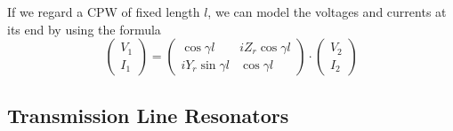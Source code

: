 \smallskip

If we regard a CPW of fixed length $l$, we can model the voltages and currents at its end by using the formula\citep{pozar_microwave_2011}
%
\begin{equation}
\left( \begin{array}{c} V_1 \\ I_1 \end{array}\right) = \left( 
		\begin{array}{cc}
			\cos{\gamma l} & iZ_r \cos{\gamma l} \\
			i Y_r \sin{\gamma l} & \cos{\gamma l}
		\end{array}
		\right) \cdot \left(
		\begin{array}{c}
			V_2 \\ I_2
		\end{array}
		\right) \label{eq:cpw_abcd_matrix}
\end{equation}
%

\subsection{Transmission Line Resonators}

